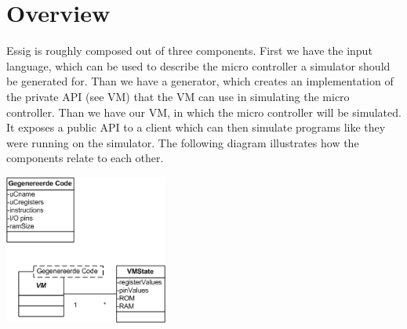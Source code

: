\chapter{Overview}
Essig is roughly composed out of three components. First we have the
input language, which can be used to describe the micro controller a
simulator should be generated for. Than we have a generator, which
creates an implementation of the private API (see VM) that the VM can
use in simulating the micro controller. Than we have our VM, in which
the micro controller will be simulated. It exposes a public API to a
client which can then simulate programs like they were running on the
simulator. The following diagram illustrates how the components relate
to each other.

\begin{center}
\includegraphics[width=5.376cm,height=4.932cm]{Essig-img002.png}
\end{center}

